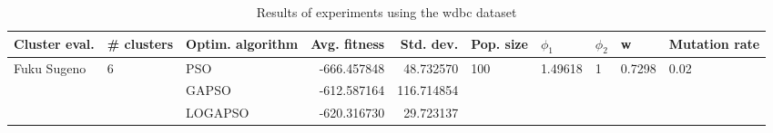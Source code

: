 \begin{table}
\centering
\caption{Results of experiments using the wdbc dataset}
\begin{tabular}{lllrrlllll}
\toprule
               Cluster eval. &        \# clusters & Optim. algorithm &  Avg. fitness &  Std. dev. &            Pop. size &               $\phi_{1}$ &         $\phi_{2}$ &                       w &         Mutation rate \\
\midrule
\multirow{3}{*}{Fuku Sugeno} & \multirow{3}{*}{6} &              PSO &   -666.457848 &  48.732570 & \multirow{3}{*}{100} & \multirow{3}{*}{1.49618} & \multirow{3}{*}{1} & \multirow{3}{*}{0.7298} & \multirow{3}{*}{0.02} \\
                             &                    &            GAPSO &   -612.587164 & 116.714854 &                      &                          &                    &                         &                       \\
                             &                    &          LOGAPSO &   -620.316730 &  29.723137 &                      &                          &                    &                         &                       \\
\bottomrule
\end{tabular}
\end{table}
